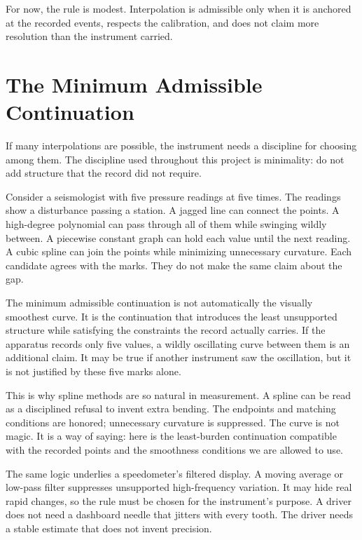 For now, the rule is modest. Interpolation is admissible only when it is
anchored at the recorded events, respects the calibration, and does not claim
more resolution than the instrument carried.

\section{The Minimum Admissible Continuation}
\label{se:the-minimum-admissible-continuation}

If many interpolations are possible, the instrument needs a discipline for
choosing among them. The discipline used throughout this project is minimality:
do not add structure that the record did not require.

Consider a seismologist with five pressure readings at five times. The readings
show a disturbance passing a station. A jagged line can connect the points. A
high-degree polynomial can pass through all of them while swinging wildly
between. A piecewise constant graph can hold each value until the next reading.
A cubic spline can join the points while minimizing unnecessary curvature. Each
candidate agrees with the marks. They do not make the same claim about the gap.

The minimum admissible continuation is not automatically the visually smoothest
curve. It is the continuation that introduces the least unsupported structure
while satisfying the constraints the record actually carries. If the apparatus
records only five values, a wildly oscillating curve between them is an
additional claim. It may be true if another instrument saw the oscillation, but
it is not justified by these five marks alone.

This is why spline methods are so natural in measurement. A spline can be read
as a disciplined refusal to invent extra bending. The endpoints and matching
conditions are honored; unnecessary curvature is suppressed. The curve is not
magic. It is a way of saying: here is the least-burden continuation compatible
with the recorded points and the smoothness conditions we are allowed to use.

The same logic underlies a speedometer's filtered display. A moving average or
low-pass filter suppresses unsupported high-frequency variation. It may hide
real rapid changes, so the rule must be chosen for the instrument's purpose. A
driver does not need a dashboard needle that jitters with every tooth. The
driver needs a stable estimate that does not invent precision.

